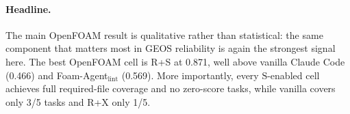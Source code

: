 \documentclass{article}
\begin{document}
\begin{table}[t]
  \caption{OpenFOAM transfer-study summary on the 5-task subset. Mean score is the file-text-and-coverage metric described above. \emph{Full coverage} is the number of tasks for which all required files were produced.}
  \label{tab:openfoam-summary}
  \centering
  \small
\end{table}

\paragraph{Headline.}
The main OpenFOAM result is qualitative rather than statistical: the same component that matters most in GEOS reliability is again the strongest signal here. The best OpenFOAM cell is R+S at 0.871, well above vanilla Claude Code (0.466) and Foam-Agent$_{\text{lint}}$ (0.569). More importantly, every $\mathrm{S}$-enabled cell achieves full required-file coverage and no zero-score tasks, while vanilla covers only 3/5 tasks and R+X only 1/5.
\end{document}
